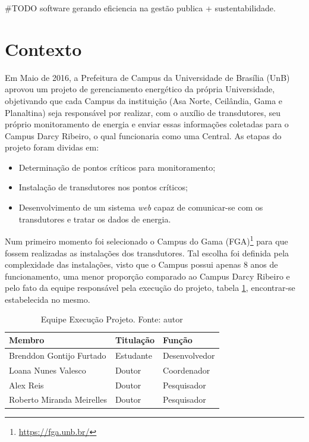 \#TODO software gerando eficiencia na gestão publica + sustentabilidade.

\section{Contexto}
Em Maio de 2016, a Prefeitura de Campus da Universidade de Brasília (UnB) aprovou um projeto de gerenciamento energético da própria Universidade, objetivando que cada Campus da instituição (Asa Norte, Ceilândia, Gama e Planaltina) seja responsável por realizar, com o auxílio de transdutores, seu próprio monitoramento de energia e enviar essas informações coletadas para o Campus Darcy Ribeiro, o qual funcionaria como uma Central. As etapas do projeto foram dividas em:
\begin{itemize}
    \item Determinação de pontos críticos para monitoramento;
    \item Instalação de transdutores nos pontos críticos;
    \item Desenvolvimento de um sistema \textit{web} capaz de comunicar-se com os transdutores e tratar os dados de energia.
\end{itemize}

Num primeiro momento foi selecionado o Campus do Gama (FGA)\footnote{\url{https://fga.unb.br/}} para que
fossem realizadas as instalações dos transdutores. Tal escolha foi definida pela complexidade das instalações, visto que o Campus possui apenas 8 anos de funcionamento, uma menor proporção comparado ao Campus Darcy Ribeiro e pelo fato da equipe responsável pela execução do projeto, tabela \ref{equipe_projeto}, encontrar-se estabelecida no mesmo.

\begin{table}[!htbp]
    \centering
    \caption{Equipe Execução Projeto. Fonte: autor}
    \label{equipe_projeto}
    \begin{tabular}{|p{5cm}|p{2cm}|p{3cm}|}
    \hline
    \textbf{Membro}                                                                    & \textbf{Titulação} & \textbf{Função}        \\\hline
    Brenddon Gontijo Furtado                                                  & Estudante & Desenvolvedor \\\hline
    Loana Nunes Valesco                                                       & Doutor    & Coordenador   \\\hline
    Alex Reis                                                                 & Doutor    & Pesquisador   \\\hline
    Roberto Miranda Meirelles                                                 & Doutor    & Pesquisador   \\\hline
    \end{tabular}
\end{table}

